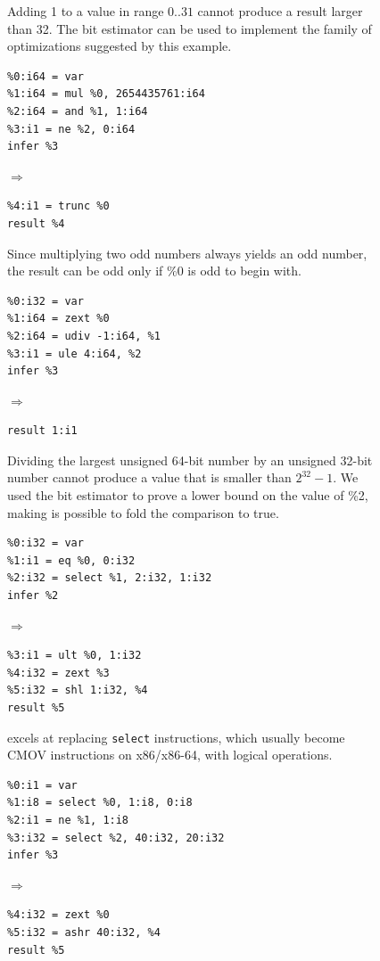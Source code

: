 \begin{figure}
{\begin{minipage}[t]{0.31\textwidth}
Adding 1 to a value in range $0..31$ cannot produce a result larger
than 32. The bit estimator can be used to implement the family of
optimizations suggested by this example.

\myrule
{\begin{verbatim}
%0:i64 = var
%1:i64 = mul %0, 2654435761:i64
%2:i64 = and %1, 1:i64
%3:i1 = ne %2, 0:i64
infer %3
\end{verbatim}}
$\Rightarrow$
{\begin{verbatim}
%4:i1 = trunc %0
result %4
\end{verbatim}}

Since multiplying two odd numbers always yields an odd number, the
result can be odd only if \%0 is odd to begin with.

\myrule
{\begin{verbatim}
%0:i32 = var
%1:i64 = zext %0
%2:i64 = udiv -1:i64, %1
%3:i1 = ule 4:i64, %2
infer %3
\end{verbatim}}
$\Rightarrow$
{\begin{verbatim}
result 1:i1
\end{verbatim}}

Dividing the largest unsigned 64-bit number by an unsigned 32-bit
number cannot produce a value that is smaller than $2^{32} - 1$.
%
We used the bit estimator to prove a lower bound on the value of \%2,
making is possible to fold the comparison to true.

\end{minipage}
%
\hspace{0.035\textwidth}
%
\begin{minipage}[t]{0.31\textwidth}

\myrule
{\begin{verbatim}
%0:i32 = var
%1:i1 = eq %0, 0:i32
%2:i32 = select %1, 2:i32, 1:i32
infer %2
\end{verbatim}}
$\Rightarrow$
{\begin{verbatim}
%3:i1 = ult %0, 1:i32
%4:i32 = zext %3
%5:i32 = shl 1:i32, %4
result %5
\end{verbatim}}

\tool{} excels at replacing \texttt{select} instructions, which
usually become CMOV instructions on x86/x86-64, with logical
operations.

\myrule
{\begin{verbatim}
%0:i1 = var
%1:i8 = select %0, 1:i8, 0:i8
%2:i1 = ne %1, 1:i8
%3:i32 = select %2, 40:i32, 20:i32
infer %3
\end{verbatim}}
$\Rightarrow$
{\begin{verbatim}
%4:i32 = zext %0
%5:i32 = ashr 40:i32, %4
result %5
\end{verbatim}}


\end{minipage}}
\end{figure}

